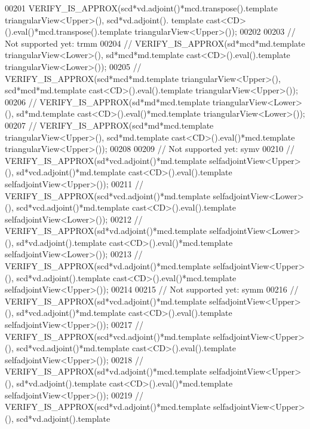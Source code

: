 \begin{DoxyCode}
00201   VERIFY\_IS\_APPROX(scd*vd.adjoint()*mcd.transpose().template triangularView<Upper>(), scd*vd.adjoint().
      template cast<CD>().eval()*mcd.transpose().template triangularView<Upper>());
00202 
00203   \textcolor{comment}{// Not supported yet: trmm}
00204 \textcolor{comment}{//   VERIFY\_IS\_APPROX(sd*mcd*md.template triangularView<Lower>(),  sd*mcd*md.template
       cast<CD>().eval().template triangularView<Lower>());}
00205 \textcolor{comment}{//   VERIFY\_IS\_APPROX(scd*mcd*md.template triangularView<Upper>(), scd*mcd*md.template
       cast<CD>().eval().template triangularView<Upper>());}
00206 \textcolor{comment}{//   VERIFY\_IS\_APPROX(sd*md*mcd.template triangularView<Lower>(),  sd*md.template
       cast<CD>().eval()*mcd.template triangularView<Lower>());}
00207 \textcolor{comment}{//   VERIFY\_IS\_APPROX(scd*md*mcd.template triangularView<Upper>(), scd*md.template
       cast<CD>().eval()*mcd.template triangularView<Upper>());}
00208 
00209   \textcolor{comment}{// Not supported yet: symv}
00210 \textcolor{comment}{//   VERIFY\_IS\_APPROX(sd*vcd.adjoint()*md.template selfadjointView<Upper>(),  sd*vcd.adjoint()*md.template
       cast<CD>().eval().template selfadjointView<Upper>());}
00211 \textcolor{comment}{//   VERIFY\_IS\_APPROX(scd*vcd.adjoint()*md.template selfadjointView<Lower>(), scd*vcd.adjoint()*md.template
       cast<CD>().eval().template selfadjointView<Lower>());}
00212 \textcolor{comment}{//   VERIFY\_IS\_APPROX(sd*vd.adjoint()*mcd.template selfadjointView<Lower>(),  sd*vd.adjoint().template
       cast<CD>().eval()*mcd.template selfadjointView<Lower>());}
00213 \textcolor{comment}{//   VERIFY\_IS\_APPROX(scd*vd.adjoint()*mcd.template selfadjointView<Upper>(), scd*vd.adjoint().template
       cast<CD>().eval()*mcd.template selfadjointView<Upper>());}
00214 
00215   \textcolor{comment}{// Not supported yet: symm}
00216 \textcolor{comment}{//   VERIFY\_IS\_APPROX(sd*vcd.adjoint()*md.template selfadjointView<Upper>(),  sd*vcd.adjoint()*md.template
       cast<CD>().eval().template selfadjointView<Upper>());}
00217 \textcolor{comment}{//   VERIFY\_IS\_APPROX(scd*vcd.adjoint()*md.template selfadjointView<Upper>(), scd*vcd.adjoint()*md.template
       cast<CD>().eval().template selfadjointView<Upper>());}
00218 \textcolor{comment}{//   VERIFY\_IS\_APPROX(sd*vd.adjoint()*mcd.template selfadjointView<Upper>(),  sd*vd.adjoint().template
       cast<CD>().eval()*mcd.template selfadjointView<Upper>());}
00219 \textcolor{comment}{//   VERIFY\_IS\_APPROX(scd*vd.adjoint()*mcd.template selfadjointView<Upper>(), scd*vd.adjoint().template
}
\end{DoxyCode}
